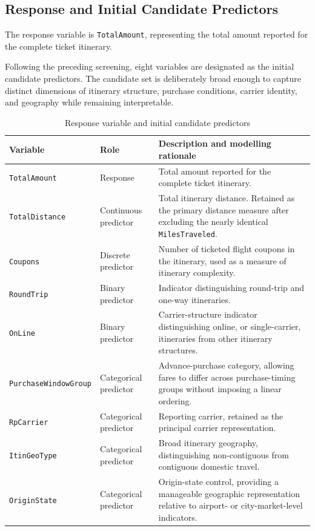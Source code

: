 \documentclass[11pt,a4paper]{article}
\begin{document}
\subsection{Response and Initial Candidate Predictors}

The response variable is \texttt{TotalAmount}, representing the total amount reported for the complete ticket itinerary.

Following the preceding screening, eight variables are designated as the initial candidate predictors. The candidate set is deliberately broad enough to capture distinct dimensions of itinerary structure, purchase conditions, carrier identity, and geography while remaining interpretable.

\begin{table}[H]
\centering
\caption{Response variable and initial candidate predictors}
\label{tab:variables}
\begin{tabularx}{\textwidth}{l l X}
\toprule
\textbf{Variable} & \textbf{Role} & \textbf{Description and modelling rationale} \\
\midrule
\texttt{TotalAmount} & Response & Total amount reported for the complete ticket itinerary. \\
\texttt{TotalDistance} & Continuous predictor & Total itinerary distance. Retained as the primary distance measure after excluding the nearly identical \texttt{MilesTraveled}. \\
\texttt{Coupons} & Discrete predictor & Number of ticketed flight coupons in the itinerary, used as a measure of itinerary complexity. \\
\texttt{RoundTrip} & Binary predictor & Indicator distinguishing round-trip and one-way itineraries. \\
\texttt{OnLine} & Binary predictor & Carrier-structure indicator distinguishing online, or single-carrier, itineraries from other itinerary structures. \\
\texttt{PurchaseWindowGroup} & Categorical predictor & Advance-purchase category, allowing fares to differ across purchase-timing groups without imposing a linear ordering. \\
\texttt{RpCarrier} & Categorical predictor & Reporting carrier, retained as the principal carrier representation. \\
\texttt{ItinGeoType} & Categorical predictor & Broad itinerary geography, distinguishing non-contiguous from contiguous domestic travel. \\
\texttt{OriginState} & Categorical predictor & Origin-state control, providing a manageable geographic representation relative to airport- or city-market-level indicators. \\
\bottomrule
\end{tabularx}
\end{table}
\end{document}
